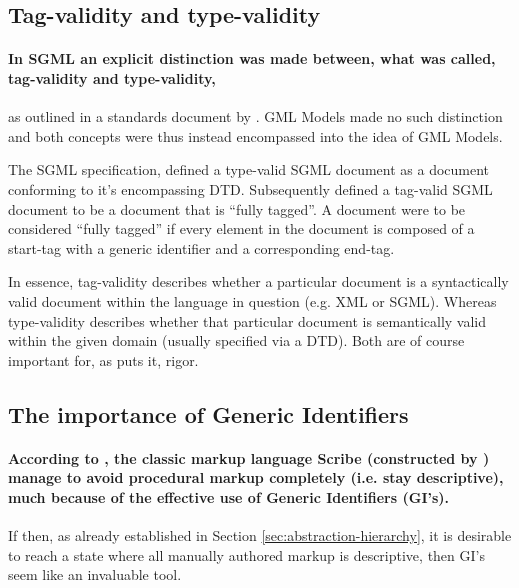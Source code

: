 \documentclass{scrreprt}
\begin{document}
\subsection{Tag-validity and type-validity}
\label{sec:tag-validity-type-validity}

\paragraph{In SGML an explicit distinction was made between, what was called, tag-validity and type-validity, } as outlined in a standards document by \citet{goldfarbXMLcoverpages}. GML Models made no such distinction and both concepts were thus instead encompassed into the idea of GML Models.

The SGML specification\citep{goldfarbXMLcoverpages}, defined a type-valid SGML document as a document conforming to it's encompassing DTD. Subsequently defined a tag-valid SGML document to be a document that is ``fully tagged''. A document were to be considered ``fully tagged'' if every element in the document is composed of a start-tag with a generic identifier and a corresponding end-tag.

In essence, tag-validity describes whether a particular document is a syntactically valid document within the language in question (e.g. XML or SGML). Whereas type-validity describes whether that particular document is semantically valid within the given domain (usually specified via a DTD). Both are of course important for, as \citet{goldfarb} puts it, rigor.


\subsection{The importance of Generic Identifiers}
\label{sec:importance-of-generic-identifiers}
\paragraph{According to \citet{goldfarb}, the classic markup language Scribe (constructed by \citet{reid}) manage to avoid procedural markup completely (i.e. stay descriptive), much because of the effective use of Generic Identifiers (GI's).}

If then, as already established in Section \ref{sec:abstraction-hierarchy}, it is desirable to reach a state where all manually authored markup is descriptive, then GI's seem like an invaluable tool.
\end{document}
